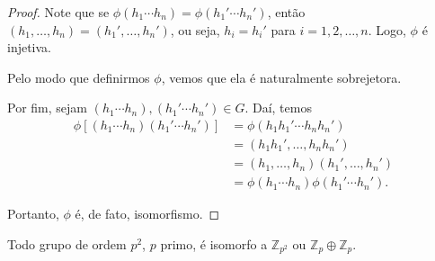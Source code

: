 \begin{proof}
		\par\vspace{0.3cm} Note que se $\phi(h_1\cdots h_n) = \phi(h_1'\cdots h_n')$, então 
		$(h_1, \dots, h_n) = (h_1', \dots, h_n')$, ou seja, $h_i = h_i'$ para $i = 1, 2, \dots, n$. 
		Logo, $\phi$ é injetiva.
		
		\par\vspace{0.3cm} Pelo modo que definirmos $\phi$, vemos que ela é naturalmente sobrejetora.
		
		\par\vspace{0.3cm} Por fim, sejam $(h_1\cdots h_n), (h_1'\cdots h_n')\in G$. Daí, temos
		\begin{align*}
		    \phi[ (h_1\cdots h_n)(h_1'\cdots h_n') ] &= \phi (h_1h_1'\cdots h_nh_n') \\ 
		                                             &= (h_1h_1', \dots, h_nh_n') \\ 
		                                             &= (h_1, \dots, h_n)(h_1', \dots, h_n') \\ 
		                                             &= \phi(h_1\cdots h_n)\phi(h_1'\cdots h_n').
		\end{align*} 
		\par\vspace{0.3cm} Portanto, $\phi$ é, de fato, isomorfismo.
	\end{proof}
	\begin{theorem}
	\label{classificacao grupos de ordem p2}
		Todo grupo de ordem $p^2$, $p$ primo, é isomorfo a $\mathbb{Z}_{p^2}$ ou $\mathbb{Z}_p\oplus\mathbb{Z}_p$.
	\end{theorem}
